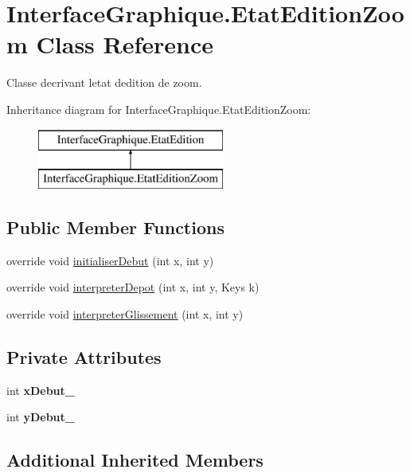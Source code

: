 \hypertarget{class_interface_graphique_1_1_etat_edition_zoom}{}\section{Interface\+Graphique.\+Etat\+Edition\+Zoom Class Reference}
\label{class_interface_graphique_1_1_etat_edition_zoom}


Classe decrivant l\textquotesingle{}etat d\textquotesingle{}edition de zoom.  


Inheritance diagram for Interface\+Graphique.\+Etat\+Edition\+Zoom\+:\begin{figure}[H]
\begin{center}
\leavevmode
\includegraphics[height=2.000000cm]{class_interface_graphique_1_1_etat_edition_zoom}
\end{center}
\end{figure}
\subsection*{Public Member Functions}
\begin{DoxyCompactItemize}
\item 
override void \hyperlink{group__inf2990_ga8d80941bca37245c8f76f6db5d6350fc}{initialiser\+Debut} (int x, int y)
\item 
override void \hyperlink{group__inf2990_ga69f84cb3df5357cba3fc880ba8a61147}{interpreter\+Depot} (int x, int y, Keys k)
\item 
override void \hyperlink{group__inf2990_ga3409e2e6b503aea9e520673c46ef92e7}{interpreter\+Glissement} (int x, int y)
\end{DoxyCompactItemize}
\subsection*{Private Attributes}
\begin{DoxyCompactItemize}
\item 
int {\bfseries x\+Debut\+\_\+}
\item 
int {\bfseries y\+Debut\+\_\+}
\end{DoxyCompactItemize}
\subsection*{Additional Inherited Members}


